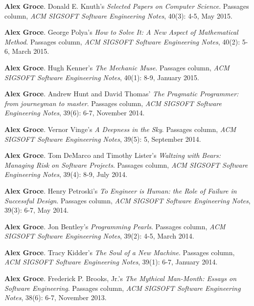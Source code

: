 \documentclass[ComputerScience]{vita}
\begin{document}
\begin{vita}
\begin{Columns, Book Reviews, and Magazine Articles}
\item {\bf Alex Groce}.
\newblock Donald E. Knuth's \emph{Selected Papers on Computer Science}.
\newblock Passages column, \emph{ACM SIGSOFT Software Engineering Notes}, 40(3): 4-5, May 2015.

\item{\bf Alex Groce}.
\newblock George Polya's \emph{How to Solve It: A New Aspect of Mathematical Method}.
\newblock Passages column, \emph{ACM SIGSOFT Software Engineering Notes}, 40(2): 5-6, March 2015.

\item {\bf Alex Groce}.
\newblock Hugh Kenner's \emph{The Mechanic Muse}.
\newblock Passages column, \emph{ACM SIGSOFT Software Engineering Notes}, 40(1): 8-9, January 2015.

\item {\bf Alex Groce}.
\newblock Andrew Hunt and David Thomas' \emph{The Pragmatic Programmer: from journeyman to master}.
\newblock Passages column, \emph{ACM SIGSOFT Software Engineering Notes}, 39(6): 6-7, November 2014.

\item {\bf Alex Groce}.
\newblock Vernor Vinge's \emph{A Deepness in the Sky}.
\newblock Passages column, \emph{ACM SIGSOFT Software Engineering Notes}, 39(5): 5, September 2014.

\item {\bf Alex Groce}.
\newblock Tom DeMarco and Timothy Lister's \emph{Waltzing with Bears: Managing Risk on Software Projects}.
\newblock Passages column, \emph{ACM SIGSOFT Software Engineering Notes}, 39(4): 8-9, July 2014.

\item {\bf Alex Groce}.
\newblock Henry Petroski's \emph{To Engineer is Human: the Role of Failure in Successful Design}.
\newblock Passages column, \emph{ACM SIGSOFT Software Engineering Notes}, 39(3): 6-7, May 2014.

\item {\bf Alex Groce}.
\newblock Jon Bentley's \emph{Programming Pearls}.
\newblock Passages column, \emph{ACM SIGSOFT Software Engineering Notes}, 39(2): 4-5, March 2014.

\item {\bf Alex Groce}.
\newblock Tracy Kidder's \emph{The Soul of a New Machine}.
\newblock Passages column, \emph{ACM SIGSOFT Software Engineering Notes}, 39(1): 6-7, January 2014.

\item {\bf Alex Groce}.
\newblock Frederick P. Brooks, Jr.'s \emph{The Mythical Man-Month: Essays on Software Engineering}.
\newblock Passages column, \emph{ACM SIGSOFT Software Engineering Notes}, 38(6): 6-7, November 2013.


\end{Columns, Book Reviews, and Magazine Articles}
\end{vita}
\end{document}
